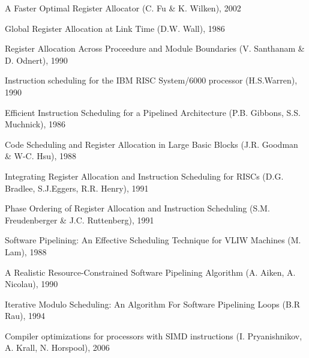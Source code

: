 \documentclass[a4paper,10pt]{article}
\begin{document}
\begin{thebibliography}{9}
A Faster Optimal Register Allocator (C. Fu \& K. Wilken), 2002

Global Register Allocation at Link Time (D.W. Wall), 1986

Register Allocation Across Proceedure and Module Boundaries (V. Santhanam \& D. Odnert), 1990

Instruction scheduling for the IBM RISC System/6000 processor (H.S.Warren), 1990

Efficient Instruction Scheduling for a Pipelined Architecture (P.B. Gibbons, S.S. Muchnick), 1986

Code Scheduling and Register Allocation in Large Basic Blocks (J.R. Goodman \& W-C. Hsu), 1988

Integrating Register Allocation and Instruction Scheduling for RISCs (D.G. Bradlee, S.J.Eggers, R.R. Henry), 1991

Phase Ordering of Register Allocation and Instruction Scheduling (S.M. Freudenberger \& J.C. Ruttenberg), 1991

Software Pipelining: An Effective Scheduling Technique for VLIW Machines (M. Lam), 1988

A Realistic Resource-Constrained Software Pipelining Algorithm (A. Aiken, A. Nicolau), 1990

Iterative Modulo Scheduling: An Algorithm For Software Pipelining Loops (B.R Rau), 1994

Compiler optimizations for processors with SIMD instructions (I. Pryanishnikov, A. Krall, N. Horspool), 2006

\end{thebibliography}
\end{document}
